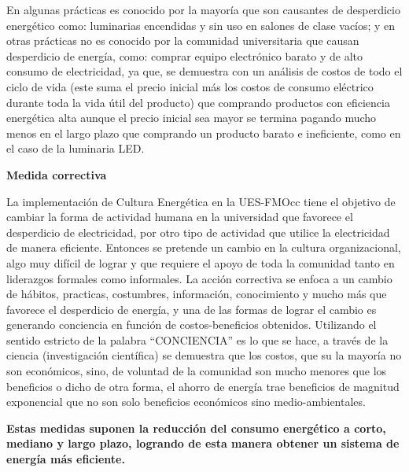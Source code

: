 \documentclass[12pt,letterpaper]{report}
\begin{document}
En algunas prácticas es conocido por la mayoría que son causantes de desperdicio energético como: luminarias encendidas y sin uso en salones de clase vacíos; y en otras prácticas no es conocido por la comunidad universitaria que causan desperdicio de energía, como: comprar equipo electrónico barato y de alto consumo de electricidad, ya que, se demuestra con un análisis de costos de todo el ciclo de vida (este suma el precio inicial más los costos de consumo eléctrico durante toda la vida útil del producto) que comprando productos con eficiencia energética alta aunque el precio inicial sea mayor se termina pagando mucho menos en el largo plazo que comprando un producto barato e ineficiente, como en el caso de la luminaria LED.

\textbf{Medida correctiva}

La implementación de Cultura Energética en la UES-FMOcc tiene el objetivo de cambiar la forma de actividad humana en la universidad que favorece el desperdicio de electricidad, por otro tipo de actividad que utilice la electricidad de manera eficiente. Entonces se pretende un cambio en la cultura organizacional, algo muy difícil de lograr y que requiere el apoyo de toda la comunidad tanto en liderazgos formales como informales. La acción correctiva se enfoca a un cambio de hábitos, practicas, costumbres, información, conocimiento y mucho más que favorece el desperdicio de energía, y una de las formas de lograr el cambio es generando conciencia en función de costos-beneficios obtenidos. Utilizando el sentido estricto de la palabra “CONCIENCIA” es lo que se hace, a través de la ciencia (investigación científica) se demuestra que los costos, que su la mayoría no son económicos, sino, de voluntad de la comunidad son mucho menores que los beneficios o dicho de otra forma, el ahorro de energía  trae beneficios de magnitud exponencial que no son solo beneficios económicos sino medio-ambientales.

\textbf{Estas medidas suponen la reducción del consumo energético a corto, mediano y largo plazo, logrando de esta manera obtener un sistema de energía más eficiente.}

\cleardoublepage
{}
\nocite{*}


\end{document}
